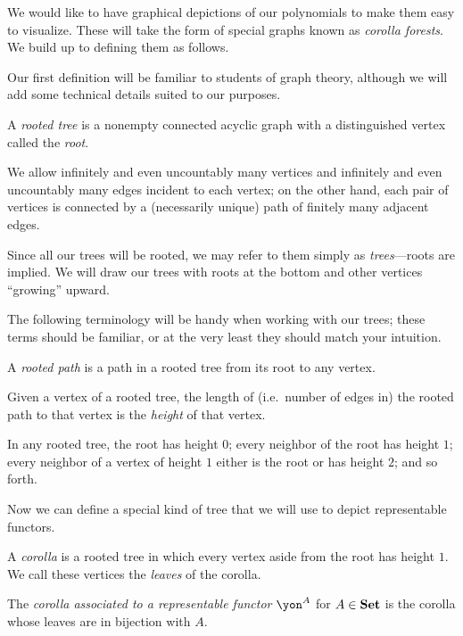 \documentclass[Book-Poly]{subfiles}
\begin{document}
We would like to have graphical depictions of our polynomials to make them easy to visualize.
These will take the form of special graphs known as \emph{corolla forests}.
We build up to defining them as follows.

Our first definition will be familiar to students of graph theory, although we will add some technical details suited to our purposes.
\begin{definition}
    A \emph{rooted tree} is a nonempty connected acyclic graph with a distinguished vertex called the \emph{root}.

    We allow infinitely and even uncountably many vertices and infinitely and even uncountably many edges incident to each vertex; on the other hand, each pair of vertices is connected by a (necessarily unique) path of finitely many adjacent edges.
\end{definition}
Since all our trees will be rooted, we may refer to them simply as \emph{trees}---roots are implied.
We will draw our trees with roots at the bottom and other vertices ``growing'' upward.

The following terminology will be handy when working with our trees; these terms should be familiar, or at the very least they should match your intuition.
\begin{definition}
    A \emph{rooted path} is a path in a rooted tree from its root to any vertex.

    Given a vertex of a rooted tree, the length of (i.e.\ number of edges in) the rooted path to that vertex is the \emph{height} of that vertex.
\end{definition}
In any rooted tree, the root has height $0$; every neighbor of the root has height $1$; every neighbor of a vertex of height $1$ either is the root or has height $2$; and so forth.

Now we can define a special kind of tree that we will use to depict representable functors.
\begin{definition}[Corolla]
    A \emph{corolla} is a rooted tree in which every vertex aside from the root has height $1$. We call these vertices the \emph{leaves} of the corolla.

    The \emph{corolla associated to a representable functor $\yon^A$} for $A\in\mathbf{Set}$ is the corolla whose leaves are in bijection with $A$.
\end{definition}
\end{document}
